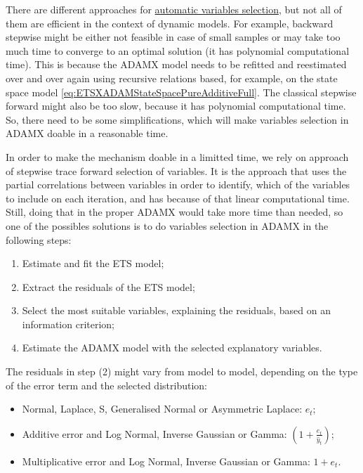\documentclass[
]{book}
\providecommand{\tightlist}{%
  \setlength{\itemsep}{0pt}\setlength{\parskip}{0pt}}
\theoremstyle{definition}
\theoremstyle{definition}
\theoremstyle{definition}
\theoremstyle{definition}
\theoremstyle{remark}
\begin{document}
There are different approaches for \protect\hyperlink{informationCriteria}{automatic variables selection}, but not all of them are efficient in the context of dynamic models. For example, backward stepwise might be either not feasible in case of small samples or may take too much time to converge to an optimal solution (it has polynomial computational time). This is because the ADAMX model needs to be refitted and reestimated over and over again using recursive relations based, for example, on the state space model \eqref{eq:ETSXADAMStateSpacePureAdditiveFull}. The classical stepwise forward might also be too slow, because it has polynomial computational time. So, there need to be some simplifications, which will make variables selection in ADAMX doable in a reasonable time.

In order to make the mechanism doable in a limitted time, we rely on \citet{Sagaert2021} approach of stepwise trace forward selection of variables. It is the approach that uses the partial correlations between variables in order to identify, which of the variables to include on each iteration, and has because of that linear computational time. Still, doing that in the proper ADAMX would take more time than needed, so one of the possibles solutions is to do variables selection in ADAMX in the following steps:

\begin{enumerate}
\def\labelenumi{\arabic{enumi}.}
\tightlist
\item
  Estimate and fit the ETS model;
\item
  Extract the residuals of the ETS model;
\item
  Select the most suitable variables, explaining the residuals, based on an information criterion;
\item
  Estimate the ADAMX model with the selected explanatory variables.
\end{enumerate}

The residuals in step (2) might vary from model to model, depending on the type of the error term and the selected distribution:

\begin{itemize}
\tightlist
\item
  Normal, Laplace, S, Generalised Normal or Asymmetric Laplace: \(e_t\);
\item
  Additive error and Log Normal, Inverse Gaussian or Gamma: \(\left(1+\frac{e_t}{\hat{y}_t} \right)\);
\item
  Multiplicative error and Log Normal, Inverse Gaussian or Gamma: \(1+e_t\).
\end{itemize}
\end{document}
